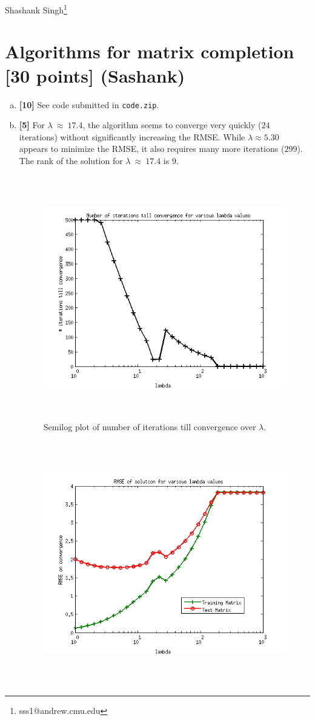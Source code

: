 \documentclass[11pt]{article}
\begin{document}
Shashank Singh\footnote{sss1@andrew.cmu.edu}
\setcounter{section}{2}
\section{Algorithms for matrix completion [30 points] (Sashank)}
\begin{enumerate}[(a)]
\item {\bf [10]} See code submitted in \texttt{code.zip}.

\item {\bf [5]} For $\lambda~\approx~17.4$, the algorithm seems to converge
very quickly ($24$ iterations) without significantly increasing the RMSE. While
$\lambda \approx 5.30$ appears to minimize the RMSE, it also requires many more
iterations ($299$). The rank of the solution for $\lambda~\approx~17.4$ is $9$.
\begin{figure}[h!]
\begin{center}
\includegraphics[width=400pt,height=300pt]{3b1}
\end{center}
\caption{Semilog plot of number of iterations till convergence over $\lambda$.}
\label{fig:num_iters}
\end{figure}
\begin{figure}[h!]
\begin{center}
\includegraphics[width=400pt,height=300pt]{3b2}

\end{center}
\end{figure}
\end{enumerate}
\end{document}
